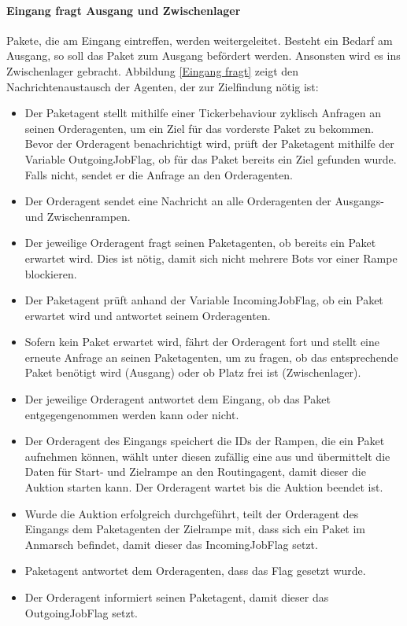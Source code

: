 \paragraph{Eingang fragt Ausgang und Zwischenlager}
Pakete, die am Eingang eintreffen, werden weitergeleitet. Besteht ein Bedarf am Ausgang, so soll das Paket zum Ausgang befördert werden. Ansonsten wird es ins Zwischenlager gebracht. Abbildung \ref{Eingang fragt} zeigt den Nachrichtenaustausch der Agenten, der zur Zielfindung nötig ist:
\begin{itemize}
\item Der Paketagent stellt mithilfe einer Tickerbehaviour zyklisch Anfragen an seinen Orderagenten, um ein Ziel für das vorderste Paket zu bekommen. Bevor der Orderagent benachrichtigt wird, prüft der Paketagent mithilfe der Variable OutgoingJobFlag, ob für das Paket bereits ein Ziel gefunden wurde. Falls nicht, sendet er die Anfrage an den Orderagenten.  
\item Der Orderagent sendet eine Nachricht an alle Orderagenten der Ausgangs- und Zwischenrampen.
\item Der jeweilige Orderagent fragt seinen Paketagenten, ob bereits ein Paket erwartet wird. Dies ist nötig, damit sich nicht mehrere Bots vor einer Rampe blockieren.
\item Der Paketagent prüft anhand der Variable IncomingJobFlag, ob ein Paket erwartet wird und antwortet seinem Orderagenten.
\item Sofern kein Paket erwartet wird, fährt der Orderagent fort und stellt eine erneute Anfrage an seinen Paketagenten, um zu fragen, ob das entsprechende Paket benötigt wird (Ausgang) oder ob Platz frei ist (Zwischenlager).
\item Der jeweilige Orderagent antwortet dem Eingang, ob das Paket entgegengenommen werden kann oder nicht.
\item Der Orderagent des Eingangs speichert die IDs der Rampen, die ein Paket aufnehmen können, wählt unter diesen zufällig eine aus und übermittelt die Daten für Start- und Zielrampe an den Routingagent, damit dieser die Auktion starten kann. Der Orderagent wartet bis die Auktion beendet ist. 
\item Wurde die Auktion erfolgreich durchgeführt, teilt der Orderagent des Eingangs dem Paketagenten der Zielrampe mit, dass sich ein Paket im Anmarsch befindet, damit dieser das IncomingJobFlag setzt.
\item Paketagent antwortet dem Orderagenten, dass das Flag gesetzt wurde.
\item Der Orderagent informiert seinen Paketagent, damit dieser das OutgoingJobFlag setzt.
\end{itemize} 

